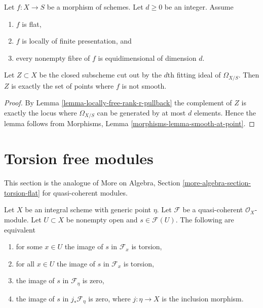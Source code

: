 \begin{lemma}
\label{lemma-d-fitting-ideal-omega-smooth}
Let $f : X \to S$ be a morphism of schemes. Let $d \geq 0$ be an integer.
Assume
\begin{enumerate}
\item $f$ is flat,
\item $f$ is locally of finite presentation, and
\item every nonempty fibre of $f$ is equidimensional of dimension $d$.
\end{enumerate}
Let $Z \subset X$ be the closed subscheme cut out by the $d$th fitting
ideal of $\Omega_{X/S}$. Then $Z$ is exactly the set of points
where $f$ is not smooth.
\end{lemma}

\begin{proof}
By Lemma \ref{lemma-locally-free-rank-r-pullback} the complement of $Z$
is exactly the locus where $\Omega_{X/S}$ can be generated by at most
$d$ elements. Hence the lemma follows from
Morphisms, Lemma \ref{morphisms-lemma-smooth-at-point}.
\end{proof}







\section{Torsion free modules}
\label{section-torsion-free}

\noindent
This section is the analogue of
More on Algebra, Section \ref{more-algebra-section-torsion-flat}
for quasi-coherent modules.

\begin{lemma}
\label{lemma-torsion-sections}
Let $X$ be an integral scheme with generic point $\eta$. Let $\mathcal{F}$
be a quasi-coherent $\mathcal{O}_X$-module. Let $U \subset X$ be nonempty
open and $s \in \mathcal{F}(U)$. The following are equivalent
\begin{enumerate}
\item for some $x \in U$ the image of $s$ in $\mathcal{F}_x$ is torsion,
\item for all $x \in U$ the image of $s$ in $\mathcal{F}_x$ is torsion,
\item the image of $s$ in $\mathcal{F}_\eta$ is zero,
\item the image of $s$ in $j_*\mathcal{F}_\eta$ is zero, where $j : \eta \to X$
is the inclusion morphism.
\end{enumerate}
\end{lemma}

